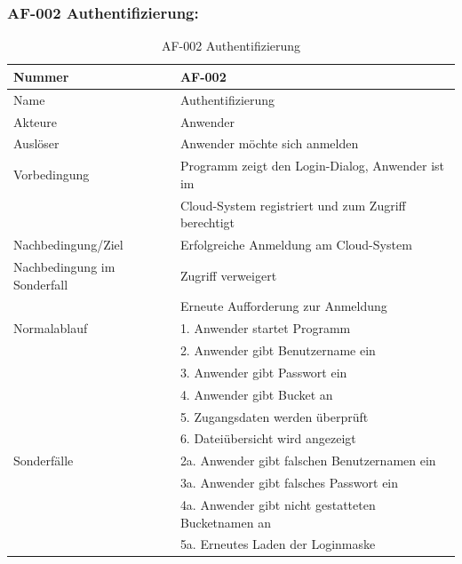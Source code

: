 \documentclass[13pt,a4paper,bibliography=totocnumbered,listof=totocnumbered]{scrartcl}
\begin{document}
\subsubsection{AF-002 Authentifizierung:}
\begin{table}[!h]
	\centering
	\begin{tabular}{|l|l|}
		\hline
		Nummer & AF-002\\
		\hline
		Name & Authentifizierung\\
		\hline
		Akteure & Anwender\\
		\hline
		Auslöser & Anwender möchte sich anmelden\\
		\hline
		Vorbedingung & Programm zeigt den Login-Dialog, Anwender ist im \\ &  Cloud-System registriert und zum Zugriff berechtigt\\
		\hline
		Nachbedingung/Ziel & Erfolgreiche Anmeldung am Cloud-System \\
		\hline
		Nachbedingung im Sonderfall & Zugriff verweigert\\ & Erneute Aufforderung zur Anmeldung\\
		\hline
		Normalablauf & 1. Anwender startet Programm \\ & 2. Anwender gibt Benutzername ein \\ & 3. Anwender gibt Passwort ein \\ & 4. Anwender gibt Bucket an \\ &5. Zugangsdaten werden überprüft \\ & 6. Dateiübersicht wird angezeigt \\
		\hline
		Sonderfälle & 2a. Anwender gibt falschen Benutzernamen ein \\ & 3a. Anwender gibt falsches Passwort ein \\& 4a. Anwender gibt nicht gestatteten Bucketnamen an\\ & 5a. Erneutes Laden der Loginmaske\\
		\hline
	\end{tabular}
	\caption{AF-002 Authentifizierung}
	\label{tab:AF-002 Authentifizierung}
\end{table}
\pagebreak
\end{document}
